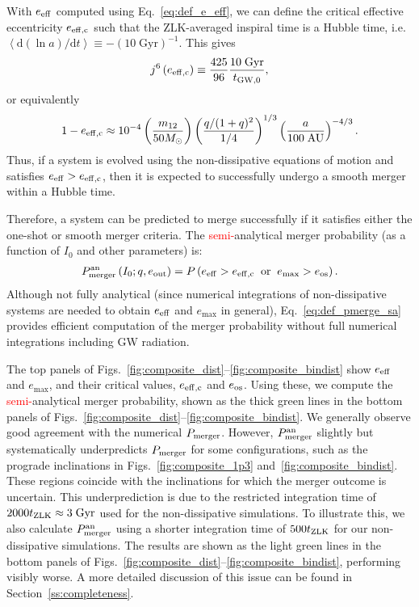 \documentclass[
        fleqn,
        usenatbib,
    ]{mnras}
\newcommand*{\rdil}[2]{\mathrm{d}#1/\mathrm{d}#2}
\newcommand*{\ev}[1]{\left\langle#1\right\rangle}
\newcommand*{\p}[1]{\left(#1\right)}
\begin{document}
With $e_{\rm eff}$ computed using Eq.~\eqref{eq:def_e_eff}, we can define the
critical effective eccentricity $e_{\rm eff, c}$ such that the ZLK-averaged
inspiral time is a Hubble time, i.e.\ $\ev{\rdil{(\ln a)}{t}} \equiv
-\p{10\;\mathrm{Gyr}}^{-1}$. This gives
\begin{align}
    j^6\p{e_{\rm eff, c}} \equiv \frac{425}{96}\frac{10\;\mathrm{Gyr}}{t_{\rm
        GW, 0}}, \label{eq:def_e_eff_c}
\end{align}
or equivalently
\begin{align}
    1 - e_{\rm eff, c} \approx 10^{-4}
        \p{\frac{m_{12}}{50M_{\odot}}}
        \p{\frac{q / (1 + q)^2}{1/4}}^{1/3}
        \p{\frac{a}{100\;\mathrm{AU}}}^{-4/3}.
\end{align}
Thus, if a system is evolved using the non-dissipative equations of motion and
satisfies $e_{\rm eff} > e_{\rm eff, c}$, then it is expected to successfully
undergo a smooth merger within a Hubble time.

Therefore, a system can be predicted to merge successfully if it satisfies either
the one-shot or smooth merger criteria. The \textcolor{red}{semi-}analytical
merger probability (as a function of $I_0$ and other parameters) is:
\begin{align}
    P_{\rm merger}^{\rm an}\p{I_0; q, e_{\rm out}} =
        P\p{e_{\rm eff} > e_{\rm eff, c} \;\;\text{or}\;\;
        e_{\max} > e_{\rm os}}.\label{eq:def_pmerge_sa}
\end{align}
Although not fully analytical (since numerical integrations of non-dissipative
systems are needed to obtain $e_{\rm eff}$ and $e_{\max}$ in general),
Eq.~\eqref{eq:def_pmerge_sa} provides efficient computation of the merger
probability without full numerical integrations including GW radiation.

The top panels of Figs.~\ref{fig:composite_dist}--\ref{fig:composite_bindist}
show $e_{\rm eff}$ and $e_{\max}$, and their critical values, $e_{\rm eff, c}$
and $e_{\rm os}$. Using these, we compute the \textcolor{red}{semi-}analytical
merger probability, shown as the thick green lines in the bottom panels of
Figs.~\ref{fig:composite_dist}--\ref{fig:composite_bindist}. We generally
observe good agreement with the numerical $P_{\rm merger}$. However, $P_{\rm
merger}^{\rm an}$ slightly but systematically underpredicts $P_{\rm merger}$ for
some configurations, such as the prograde inclinations in
Figs.~\ref{fig:composite_1p3} and~\ref{fig:composite_bindist}. These regions
coincide with the inclinations for which the merger outcome is uncertain. This
underprediction is due to the restricted integration time of $2000 t_{\rm ZLK}
\approx 3\;\mathrm{Gyr}$ used for the non-dissipative simulations. To illustrate
this, we also calculate $P_{\rm merger}^{\rm an}$ using a shorter integration
time of $500 t_{\rm ZLK}$ for our non-dissipative simulations. The results are
shown as the light green lines in the bottom panels of
Figs.~\ref{fig:composite_dist}--\ref{fig:composite_bindist}, performing visibly
worse. A more detailed discussion of this issue can be found in
Section~\ref{ss:completeness}.
\end{document}
